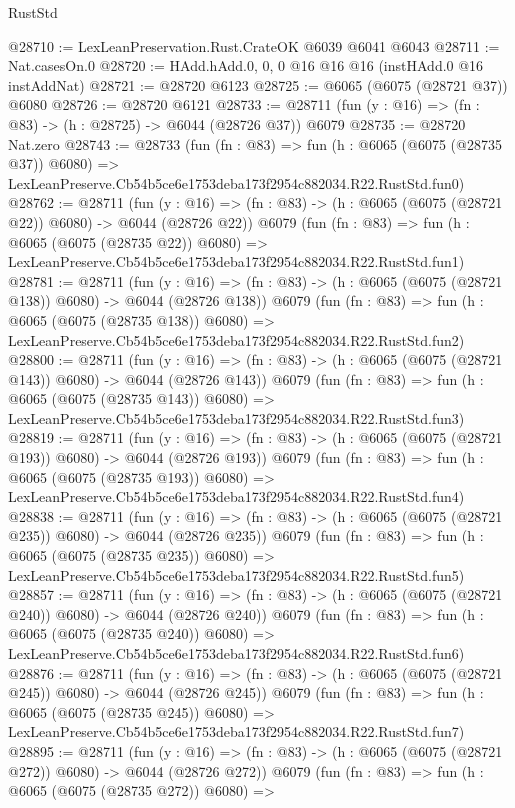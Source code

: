 \begin{lexlean}{RustStd}
\begin{coremodule}
@28710 := LexLeanPreservation.Rust.CrateOK @6039 @6041 @6043
@28711 := Nat.casesOn.{0}
@28720 := HAdd.hAdd.{0, 0, 0} @16 @16 @16 (instHAdd.{0} @16 instAddNat)
@28721 := @28720 @6123
@28725 := @6065 (@6075 (@28721 @37)) @6080
@28726 := @28720 @6121
@28733 := @28711 (fun (y : @16) => (fn : @83) -> (h : @28725) -> @6044 (@28726 @37)) @6079
@28735 := @28720 Nat.zero
@28743 := @28733
    (fun (fn : @83) =>
    fun (h : @6065 (@6075 (@28735 @37)) @6080) =>
    LexLeanPreserve.Cb54b5ce6e1753deba173f2954c882034.R22.RustStd.fun0)
@28762 := @28711
    (fun (y : @16) => (fn : @83) -> (h : @6065 (@6075 (@28721 @22)) @6080) -> @6044 (@28726 @22))
    @6079
    (fun (fn : @83) =>
    fun (h : @6065 (@6075 (@28735 @22)) @6080) =>
    LexLeanPreserve.Cb54b5ce6e1753deba173f2954c882034.R22.RustStd.fun1)
@28781 := @28711
    (fun (y : @16) => (fn : @83) -> (h : @6065 (@6075 (@28721 @138)) @6080) -> @6044 (@28726 @138))
    @6079
    (fun (fn : @83) =>
    fun (h : @6065 (@6075 (@28735 @138)) @6080) =>
    LexLeanPreserve.Cb54b5ce6e1753deba173f2954c882034.R22.RustStd.fun2)
@28800 := @28711
    (fun (y : @16) => (fn : @83) -> (h : @6065 (@6075 (@28721 @143)) @6080) -> @6044 (@28726 @143))
    @6079
    (fun (fn : @83) =>
    fun (h : @6065 (@6075 (@28735 @143)) @6080) =>
    LexLeanPreserve.Cb54b5ce6e1753deba173f2954c882034.R22.RustStd.fun3)
@28819 := @28711
    (fun (y : @16) => (fn : @83) -> (h : @6065 (@6075 (@28721 @193)) @6080) -> @6044 (@28726 @193))
    @6079
    (fun (fn : @83) =>
    fun (h : @6065 (@6075 (@28735 @193)) @6080) =>
    LexLeanPreserve.Cb54b5ce6e1753deba173f2954c882034.R22.RustStd.fun4)
@28838 := @28711
    (fun (y : @16) => (fn : @83) -> (h : @6065 (@6075 (@28721 @235)) @6080) -> @6044 (@28726 @235))
    @6079
    (fun (fn : @83) =>
    fun (h : @6065 (@6075 (@28735 @235)) @6080) =>
    LexLeanPreserve.Cb54b5ce6e1753deba173f2954c882034.R22.RustStd.fun5)
@28857 := @28711
    (fun (y : @16) => (fn : @83) -> (h : @6065 (@6075 (@28721 @240)) @6080) -> @6044 (@28726 @240))
    @6079
    (fun (fn : @83) =>
    fun (h : @6065 (@6075 (@28735 @240)) @6080) =>
    LexLeanPreserve.Cb54b5ce6e1753deba173f2954c882034.R22.RustStd.fun6)
@28876 := @28711
    (fun (y : @16) => (fn : @83) -> (h : @6065 (@6075 (@28721 @245)) @6080) -> @6044 (@28726 @245))
    @6079
    (fun (fn : @83) =>
    fun (h : @6065 (@6075 (@28735 @245)) @6080) =>
    LexLeanPreserve.Cb54b5ce6e1753deba173f2954c882034.R22.RustStd.fun7)
@28895 := @28711
    (fun (y : @16) => (fn : @83) -> (h : @6065 (@6075 (@28721 @272)) @6080) -> @6044 (@28726 @272))
    @6079
    (fun (fn : @83) =>
    fun (h : @6065 (@6075 (@28735 @272)) @6080) =>

\end{coremodule}
\end{lexlean}
